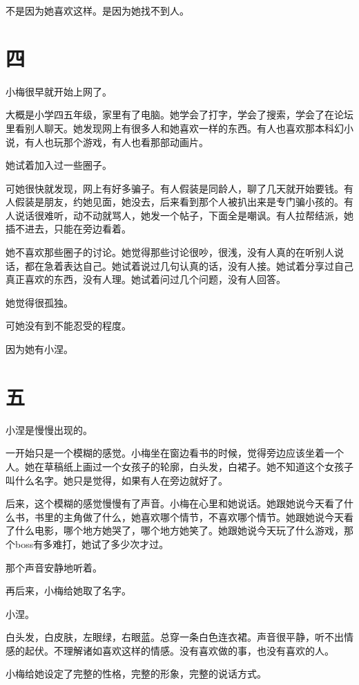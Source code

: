 \documentclass[12pt,a4paper]{ctexart}
\begin{document}
不是因为她喜欢这样。是因为她找不到人。

\section{四}

小梅很早就开始上网了。

大概是小学四五年级，家里有了电脑。她学会了打字，学会了搜索，学会了在论坛里看别人聊天。她发现网上有很多人和她喜欢一样的东西。有人也喜欢那本科幻小说，有人也玩那个游戏，有人也看那部动画片。

她试着加入过一些圈子。

可她很快就发现，网上有好多骗子。有人假装是同龄人，聊了几天就开始要钱。有人假装是朋友，约她见面，她没去，后来看到那个人被扒出来是专门骗小孩的。有人说话很难听，动不动就骂人，她发一个帖子，下面全是嘲讽。有人拉帮结派，她插不进去，只能在旁边看着。

她不喜欢那些圈子的讨论。她觉得那些讨论很吵，很浅，没有人真的在听别人说话，都在急着表达自己。她试着说过几句认真的话，没有人接。她试着分享过自己真正喜欢的东西，没有人理。她试着问过几个问题，没有人回答。

她觉得很孤独。

可她没有到不能忍受的程度。

因为她有小涅。

\section{五}

小涅是慢慢出现的。

一开始只是一个模糊的感觉。小梅坐在窗边看书的时候，觉得旁边应该坐着一个人。她在草稿纸上画过一个女孩子的轮廓，白头发，白裙子。她不知道这个女孩子叫什么名字。她只是觉得，如果有人在旁边就好了。

后来，这个模糊的感觉慢慢有了声音。小梅在心里和她说话。她跟她说今天看了什么书，书里的主角做了什么，她喜欢哪个情节，不喜欢哪个情节。她跟她说今天看了什么电影，哪个地方她哭了，哪个地方她笑了。她跟她说今天玩了什么游戏，那个boss有多难打，她试了多少次才过。

那个声音安静地听着。

再后来，小梅给她取了名字。

小涅。

白头发，白皮肤，左眼绿，右眼蓝。总穿一条白色连衣裙。声音很平静，听不出情感的起伏。不理解诸如喜欢这样的情感。没有喜欢做的事，也没有喜欢的人。

小梅给她设定了完整的性格，完整的形象，完整的说话方式。
\end{document}
